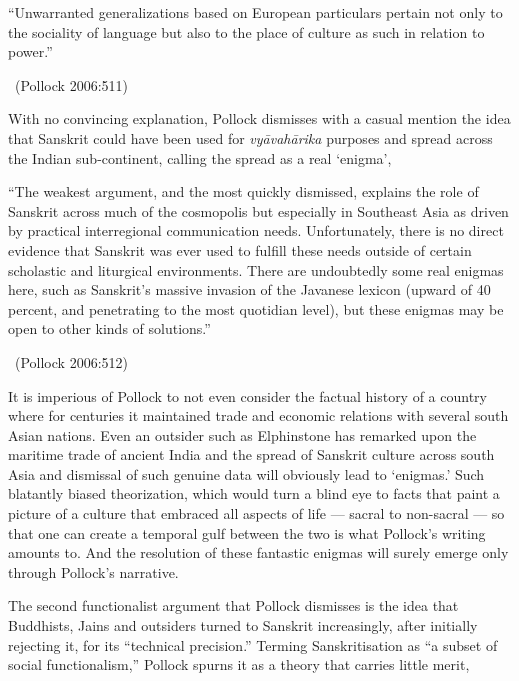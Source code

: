 \begin{myquote}
“Unwarranted generalizations based on European particulars pertain not only to the sociality of language but also to the place of culture as such in relation to power.” 

\vskip -5pt

~\hfill (Pollock 2006:511)
\end{myquote}

With no convincing explanation, Pollock dismisses with a casual mention the idea that Sanskrit could have been used for \textit{vyāvahārika} purposes and spread across the Indian sub-continent, calling the spread as a real ‘enigma’,

\begin{myquote}
“The weakest argument, and the most quickly dismissed, explains the role of Sanskrit across much of the cosmopolis but especially in Southeast Asia as driven by practical interregional communication needs. Unfortunately, there is no direct evidence that Sanskrit was ever used to fulfill these needs outside of certain scholastic and liturgical environments. There are undoubtedly some real enigmas here, such as Sanskrit’s massive invasion of the Javanese lexicon (upward of 40 percent, and penetrating to the most quotidian level), but these enigmas may be open to other kinds of solutions.” 

\vskip -5pt

~\hfill (Pollock 2006:512)
\end{myquote}

It is imperious of Pollock to not even consider the factual history of a country where for centuries it maintained trade and economic relations with several south Asian nations. Even an outsider such as Elphinstone has remarked upon the maritime trade of ancient India and the spread of Sanskrit culture across south Asia and dismissal of such genuine data will obviously lead to ‘enigmas.’ Such blatantly biased theorization, which would turn a blind eye to facts that paint a picture of a culture that embraced all aspects of life — sacral to non-sacral — so that one can create a temporal gulf between the two is what Pollock’s writing amounts to. And the resolution of these fantastic enigmas will surely emerge only through Pollock’s narrative.

The second functionalist argument that Pollock dismisses is the idea that Buddhists, Jains and outsiders turned to Sanskrit increasingly, after initially rejecting it, for its “technical precision.” Terming Sanskritisation as “a subset of social functionalism,” Pollock spurns it as a theory that carries little merit,

